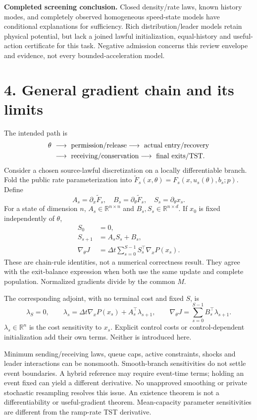 \documentclass[11pt,a4paper]{article}
\newcommand{\R}{\mathbb R}
\begin{document}
\textbf{Completed screening conclusion.} Closed density/rate laws, known
history modes, and completely observed homogeneous speed-state models have
conditional explanations for sufficiency. Rich distribution/leader models
retain physical potential, but lack a joined lawful initialization, equal-history
and useful-action certificate for this task. Negative admission concerns this
review envelope and evidence, not every bounded-acceleration model.

\newpage
\section*{4. General gradient chain and its limits}
The intended path is
\begin{align*}
 \theta&\ \longrightarrow\ {\rm permission/release}
 \longrightarrow\ {\rm actual\ entry/recovery}\\
 &\ \longrightarrow\ {\rm receiving/conservation}
 \longrightarrow\ {\rm final\ exits/TST}.
\end{align*}
Consider a chosen source-lawful discretization on a locally differentiable
branch. Fold the public rate parameterization into
$\widetilde F_s(x,\theta)=F_s(x,u_s(\theta),b_s;p)$. Define
\[
 A_s=\partial_x\widetilde F_s,\quad
 B_s=\partial_\theta\widetilde F_s,\quad
 S_s=\partial_\theta x_s.
\]
For a state of dimension $n$, $A_s\in\R^{n\times n}$ and
$B_s,S_s\in\R^{n\times d}$. If $x_0$ is fixed independently of $\theta$,
\begin{align*}
 S_0&=0,\\
 S_{s+1}&=A_sS_s+B_s,\\
 \nabla_\theta J&=\Delta t\sum_{s=0}^{S-1}
                         S_s^\top\nabla_x P(x_s).
\end{align*}
These are chain-rule identities, not a numerical correctness result.
They agree with the exit-balance expression when both use the same update and
complete population. Normalized gradients divide by the common $M$.

The corresponding adjoint, with no terminal cost and fixed $S$, is
\[
 \lambda_S=0,\qquad
 \lambda_s=\Delta t\nabla_xP(x_s)+A_s^\top\lambda_{s+1},\qquad
 \nabla_\theta J=\sum_{s=0}^{S-1}B_s^\top\lambda_{s+1}.
\]
$\lambda_s\in\R^n$ is the cost sensitivity to $x_s$. Explicit control costs or
control-dependent initialization add their own terms. Neither is introduced here.

Minimum sending/receiving laws, queue caps, active constraints, shocks and
leader interactions can be nonsmooth. Smooth-branch sensitivities do not settle
event boundaries. A hybrid reference may require event-time terms; holding an
event fixed can yield a different derivative. No unapproved smoothing or private
stochastic resampling resolves this issue. An existence theorem is not a
differentiability or useful-gradient theorem. Mean-capacity parameter sensitivities
are different from the ramp-rate TST derivative.
\end{document}
